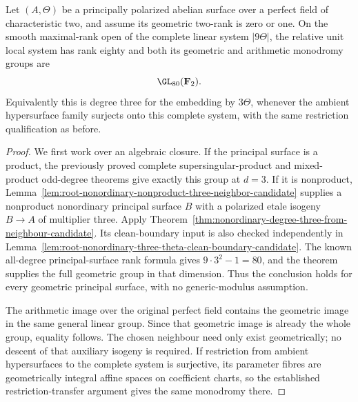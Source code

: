 \begin{theorem}
\label{thm:root-every-nonordinary-ppav-degree-three-full-candidate}
Let $(A,\Theta)$ be a principally polarized abelian surface over a
perfect field of characteristic two, and assume its geometric
two-rank is zero or one. On the smooth maximal-rank open of the
complete linear system $|9\Theta|$, the relative unit local system
has rank eighty and both its geometric and arithmetic monodromy
groups are
\[
                            \GL_{80}(\mathbf F_2).
\]
Equivalently this is degree three for the embedding by $3\Theta$,
whenever the ambient hypersurface family surjects onto this complete
system, with the same restriction qualification as before.
\end{theorem}
\begin{proof}
We first work over an algebraic closure. If the principal surface
is a product, the previously proved complete supersingular-product
and mixed-product odd-degree theorems give exactly this group at
$d=3$. If it is nonproduct,
Lemma~\ref{lem:root-nonordinary-nonproduct-three-neighbor-candidate}
supplies a nonproduct nonordinary principal surface $B$ with a
polarized etale isogeny $B\to A$ of multiplier three. Apply
Theorem~\ref{thm:nonordinary-degree-three-from-neighbour-candidate}.
Its clean-boundary input is also checked independently in
Lemma~\ref{lem:root-nonordinary-three-theta-clean-boundary-candidate}.
The known all-degree principal-surface rank formula gives
$9\cdot3^2-1=80$, and the theorem supplies the full geometric
group in that dimension. Thus the conclusion holds for every
geometric principal surface, with no generic-modulus assumption.

The arithmetic image over the original perfect field contains
the geometric image in the same general linear group. Since that
geometric image is already the whole group, equality follows.
The chosen neighbour need only exist geometrically; no descent
of that auxiliary isogeny is required. If restriction from ambient
hypersurfaces to the complete system is surjective, its parameter
fibres are geometrically integral affine spaces on coefficient
charts, so the established restriction-transfer argument gives
the same monodromy there.
\end{proof}
